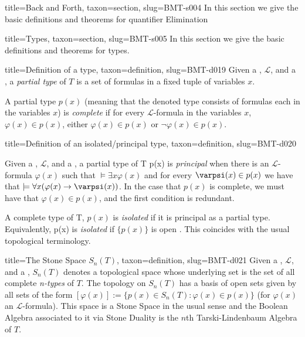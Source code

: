 \documentclass[a4paper]{article}
\begin{document}
  
  
\begin{tree}{title={Back and Forth}, taxon={section}, slug={BMT-s004}}
In this section we give the basic definitions and theorems for quantifier Elimination
\end{tree}


  
  
\begin{tree}{title={Types}, taxon={section}, slug={BMT-s005}}
In this section we give the basic definitions and theorems for types.
\begin{tree}{title={Definition of a type}, taxon={definition}, slug={BMT-d019}}
Given a , \(\mathcal {L}\), and a , a \emph{partial type} of \(T\) is a  set of formulas in a fixed tuple of variables \(x\).\par{A partial type \(p(x)\) (meaning that the denoted type consists of formulas each in the variables \(x\)) is \emph{complete} if for every \(\mathcal {L}\)-formula in the variables \(x\), \(\varphi (x) \in  p(x)\), either \(\varphi (x) \in  p(x)\) or \(\neg   \varphi (x) \in  p(x)\).}
\end{tree}

\begin{tree}{title={Definition of an isolated/principal type}, taxon={definition}, slug={BMT-d020}}

    Given a , \(\mathcal {L}\), and a ,
    a partial type of T {p(x)} is \emph{principal} when there is an \(\mathcal {L}\)-formula \(\varphi (x)\) such that
    \(\models   \exists  x  \varphi (x)\) and for every \(\varpsi (x)  \in  p(x)\) we have that
    \(\models   \forall  x ( \varphi (x)  \rightarrow   \varpsi (x))\).
    In the case that \(p(x)\) is complete, we must have that \(\varphi (x) \in  p(x)\),
    and the first condition is redundant.
\par{
    A complete type of T, \(p(x)\) is \emph{isolated} if it is principal as a partial type.
    Equivalently, {p(x)} is \emph{isolated} if \(\{ p(x) \}\) is open .
    This coincides with the usual topological terminology.
}
\end{tree}

\begin{tree}{title={The Stone Space \(S_n(T)\)}, taxon={definition}, slug={BMT-d021}}
Given a , \(\mathcal {L}\), and a ,
\(S_n(T)\) denotes a topological space whose underlying set is the set of all complete \emph{n-types} of \(T\).
The topology on \(S_n(T)\) has a basis of open sets given by all sets of the form \([ \varphi (x)] :=  \{ p(x) \in  S_n(T):
 \varphi (x)  \in  p(x) \}\) (for \(\varphi (x)\) an \(\mathcal {L}\)-formula).
This space is a Stone Space in the usual sense and the Boolean Algebra associated to it via Stone Duality is
the \(n\)th Tarski-Lindenbaum Algebra of \(T\).
\end{tree}


\end{tree}
\end{document}
